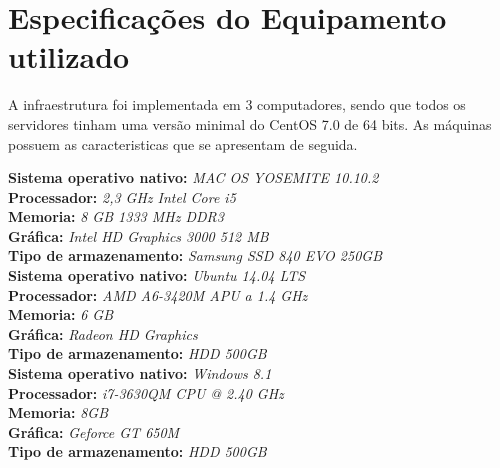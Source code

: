\section{Especificações do Equipamento utilizado}

A infraestrutura foi implementada em 3 computadores, sendo que todos os servidores tinham uma versão minimal do CentOS 7.0 de 64 bits. As máquinas possuem as caracteristicas que se apresentam de seguida.

\textbf{Sistema operativo nativo:} \textit{MAC OS YOSEMITE 10.10.2} \\
\textbf{Processador:} \textit{2,3 GHz Intel Core i5} \\
\textbf{Memoria:} \textit{8 GB 1333 MHz DDR3} \\
\textbf{Gráfica:} \textit{Intel HD Graphics 3000 512 MB} \\
\textbf{Tipo de armazenamento:} \textit{Samsung SSD 840 EVO 250GB} \\

\textbf{Sistema operativo nativo:} \textit{Ubuntu 14.04 LTS} \\
\textbf{Processador:} \textit{AMD A6-3420M APU a 1.4 GHz} \\
\textbf{Memoria:} \textit{6 GB} \\
\textbf{Gráfica:} \textit{Radeon HD Graphics} \\
\textbf{Tipo de armazenamento:} \textit{HDD 500GB} \\

\textbf{Sistema operativo nativo:} \textit{Windows 8.1} \\
\textbf{Processador:} \textit{i7-3630QM CPU @ 2.40 GHz} \\
\textbf{Memoria:} \textit{8GB} \\
\textbf{Gráfica:} \textit{Geforce GT 650M} \\
\textbf{Tipo de armazenamento:} \textit{HDD 500GB} \\
